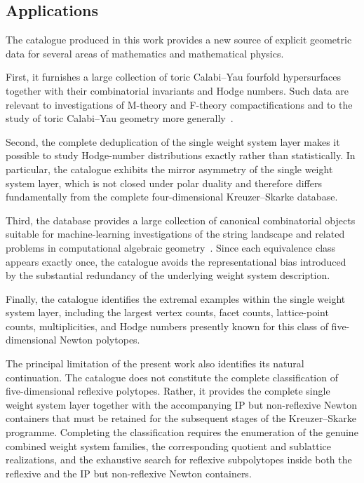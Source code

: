\documentclass[appliedmath,article,submit,moreauthors]{Definitions/mdpi}
\begin{document}
\subsection{Applications}
\label{sec:discussion-applications}

The catalogue produced in this work provides a new source of explicit geometric
data for several areas of mathematics and mathematical physics.

First, it furnishes a large collection of toric Calabi--Yau fourfold
hypersurfaces together with their combinatorial invariants and Hodge numbers.
Such data are relevant to investigations of M-theory and F-theory
compactifications and to the study of toric Calabi--Yau geometry more
generally~\cite{Vafa1996,BeckerBecker1996,BrunnerSchimmrigk1996,Weigand2018}.

Second, the complete deduplication of the single weight system layer makes it
possible to study Hodge-number distributions exactly rather than statistically.
In particular, the catalogue exhibits the mirror asymmetry of the
single weight system layer, which is not closed under polar duality and
therefore differs fundamentally from the complete four-dimensional
Kreuzer--Skarke database.

Third, the database provides a large collection of canonical combinatorial
objects suitable for machine-learning investigations of the string landscape and
related problems in computational algebraic geometry~\cite{He2017,Berglund2024}.
Since each equivalence class appears exactly once, the catalogue avoids the
representational bias introduced by the substantial redundancy of the underlying
weight system description.

Finally, the catalogue identifies the extremal examples within the
single weight system layer, including the largest vertex counts, facet counts,
lattice-point counts, multiplicities, and Hodge numbers presently known for this
class of five-dimensional Newton polytopes.

The principal limitation of the present work also identifies its natural
continuation. The catalogue does not constitute the complete classification of
five-dimensional reflexive polytopes. Rather, it provides the complete
single weight system layer together with the accompanying IP but non-reflexive
Newton containers that must be retained for the subsequent stages of the
Kreuzer--Skarke programme. Completing the classification requires the
enumeration of the genuine combined weight system families, the corresponding
quotient and sublattice realizations, and the exhaustive search for reflexive
subpolytopes inside both the reflexive and the IP but non-reflexive Newton
containers.
\end{document}
